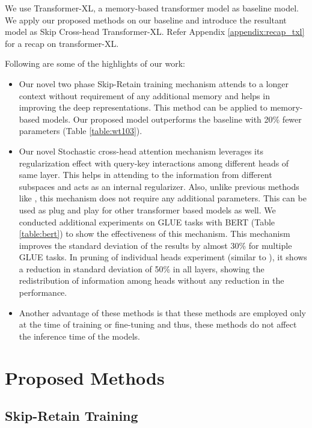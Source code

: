 \documentclass[11pt]{article}
\begin{document}
We use Transformer-XL, a memory-based transformer model as baseline model. We apply our proposed methods on our baseline and introduce the resultant model as Skip Cross-head Transformer-XL. Refer Appendix \ref{appendix:recap_txl} for a recap on transformer-XL.




Following are some of the highlights of our work:

\begin{itemize}
    \item Our novel two phase Skip-Retain training mechanism attends to a longer context without requirement of any additional memory and helps in improving the deep representations. This method can be applied to memory-based models. Our proposed model outperforms the baseline with 20\% fewer parameters (Table \ref{table:wt103}).
    \item  Our novel Stochastic cross-head attention mechanism leverages its regularization effect with query-key interactions among different heads of same layer. This helps in attending to the information from different subspaces and acts as  an internal regularizer. Also, unlike previous methods like \citep{DBLP:journals/corr/abs-2003-02436}, this mechanism  does not require any additional parameters. This can be used as plug and play for other transformer based models as well. We conducted additional experiments on GLUE tasks \citep{DBLP:conf/iclr/WangSMHLB19} with BERT \citep{DBLP:conf/naacl/DevlinCLT19} (Table \ref{table:bert}) to show the effectiveness of this mechanism. This mechanism improves the standard deviation of the results by almost 30\% for multiple GLUE tasks. In pruning of individual heads experiment (similar to \citet{DBLP:conf/nips/MichelLN19}), it shows a reduction in standard deviation of 50\% in all layers, showing the redistribution of information among heads without any reduction in the performance.
    \item Another advantage of these methods is that these methods are employed only at the time of training or fine-tuning and thus, these methods do not affect the inference time of the models.
\end{itemize}



\section{Proposed Methods}


\subsection{Skip-Retain Training}
\end{document}
